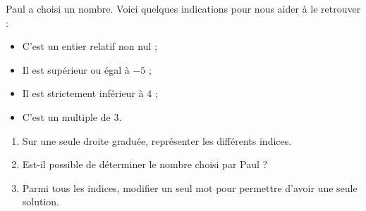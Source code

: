 \documentclass[10pt,openright,twoside,french]{book}
\begin{document}

Paul a choisi un nombre. Voici quelques indications pour nous aider à le retrouver :
\begin{itemize}
    \item C'est un entier relatif non nul ;
    \item Il est supérieur ou égal à $-5$ ;
    \item Il est strictement inférieur à $4$ ;
    \item C'est un multiple de $3$.
\end{itemize}\bigskip

\begin{enumerate}
    \item Sur une seule droite graduée, représenter les différents indices.
    \item Est-il possible de déterminer le nombre choisi par Paul ?
    \item Parmi tous les indices, modifier un seul mot pour permettre d'avoir une seule solution.
\end{enumerate}
\end{document}
